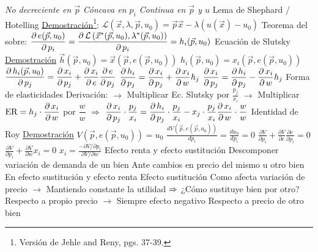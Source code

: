 \documentclass{nuevotema}
\begin{document}
\begin{esquemal}
				\4[(iii)] \textit{No decreciente en $\vec{p}$}
				\4[(iv)] \textit{Cóncava en $p_i$}
				\4[(v)] \textit{Continua en $\vec{p}$ y $u$}
			\3 Lema de Shephard / Hotelling
				\4 
				\4 \underline{Demostración}\footnote{Versión de Jehle and Reny, pgs. 37-39.}:
				\4[(1)] $\mathcal{L}(\vec{x}, \lambda, \vec{p}, u_0)=\vec{p} \vec{x} - \lambda \left( u(\vec{x}) - u_0 \right)$
				\4[(2)] Teorema del sobre:
				\4[] $\dfrac{\partial \, e(\vec{p}, u_0) }{\partial \, p_i} = \dfrac{\partial \, \mathcal{L}\left( \vec{x}^*(\vec{p}, u_0), \lambda^*(\vec{p}, u_0) \right)}{\partial \, p_i}=h_i(\vec{p},u_0)$
			\3 Ecuación de Slutsky
				\4 
				\4 \underline{Demostración}
				\4[(1)] $\vec{h}(\vec{p}, u_0) = \vec{x}\left( \vec{p}, e(\vec{p}, u_0) \right)$
				\4[$\Rightarrow$] $h_i(\vec{p}, u_0) = x_i \left( \vec{p}, e(\vec{p}, u_0) \right)$
				\4[(2)] $\dfrac{\partial \, h_i(\vec{p},u_0)}{\partial \, p_j} = \dfrac{\partial \, x_i}{\partial \, p_j} + \dfrac{\partial \, x_i}{\partial \, e} \dfrac{\partial \, e}{\partial \, p_j}$
				\4[(3)] $\dfrac{\partial \, h_i}{\partial \, p_j} = \dfrac{\partial \, x_i}{\partial \, p_j} + \dfrac{\partial \, x_i}{\partial \, w} h_j $
				\4[(4)] $\dfrac{\partial \, x_i}{\partial \, p_j} = \dfrac{\partial \, h_i}{\partial \, p_j} - \dfrac{\partial \, x_i}{\partial \, w} h_j$
				\4 Forma de elasticidades 
				\4[] Derivación:
				\4[] $\to$ Multiplicar Ec. Slutsky por $\frac{p_j}{x_i}$
				\4[] $\to$ Multiplicar $\text{ER}=h_j \cdot \dfrac{\partial \, x_i}{\partial \, w}$ por $\dfrac{w}{w}$
				\4[] $\Rightarrow$ $ \dfrac{\partial \, x_i}{\partial \, p_j} \cdot \dfrac{p_j}{x_i} = \dfrac{\partial \, h_i}{\partial \, p_j} \cdot \dfrac{p_j}{x_i} - x_j \cdot \dfrac{p_j}{x_i} \dfrac{\partial \, x_i}{\partial \, w} \cdot \dfrac{w}{w} $
			\3 Identidad de Roy
				\4 
				\4 \underline{Demostración}
				\4[(1)] $V(\vec{p}, e(\vec{p}, u_0)) = u_0$
				\4[(2)] $ \frac{d V(\vec{p}, e(\vec{p}, u_0))}{d p_i} = \frac{d u_0}{d p_i}=0$
				\4[(3)] $ \frac{\partial V}{\partial p_i} + \frac{\partial V}{\partial e} \frac{\partial e}{\partial p_i} = 0$
				\4[(4)] $ \frac{\partial V}{\partial p_i} + \frac{\partial V}{\partial w} x_i = 0$
				\4[(5)] $x_i = \frac{- \partial V / \partial p_i}{\partial V / \partial w}$
			\3 Efecto renta y efecto sustitución
				\4 Descomponer variación de demanda de un bien
				\4[] Ante cambios en precio del mismo u otro bien
				\4[] En efecto sustitución y efecto renta
				\4 Efecto sustitución
				\4[] Como afecta variación de precio
				\4[] $\to$ Mantiendo constante la utilidad
				\4[] $\Rightarrow$ ¿Cómo sustituye bien por otro?
				\4[] Respecto a propio precio
				\4[] $\to$ Siempre efecto negativo
				\4[] Respecto a precio de otro bien

\end{esquemal}
\end{document}
